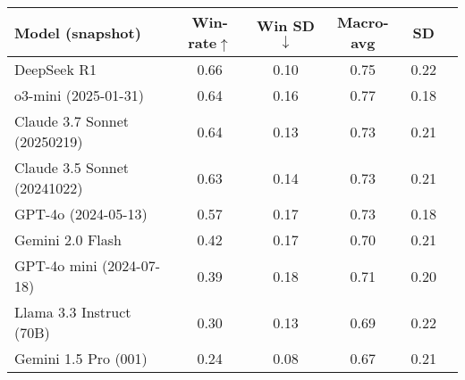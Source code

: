 \begin{tabular}{lccccc}
\toprule
Model (snapshot) & Win-rate$\uparrow$ & Win SD$\downarrow$ & Macro-avg & SD \\
\midrule
DeepSeek R1 & 0.66 & 0.10 & 0.75 & 0.22 \\
o3-mini (2025-01-31) & 0.64 & 0.16 & 0.77 & 0.18 \\
Claude 3.7 Sonnet (20250219) & 0.64 & 0.13 & 0.73 & 0.21 \\
Claude 3.5 Sonnet (20241022) & 0.63 & 0.14 & 0.73 & 0.21 \\
GPT-4o (2024-05-13) & 0.57 & 0.17 & 0.73 & 0.18 \\
Gemini 2.0 Flash & 0.42 & 0.17 & 0.70 & 0.21 \\
GPT-4o mini (2024-07-18) & 0.39 & 0.18 & 0.71 & 0.20 \\
Llama 3.3 Instruct (70B) & 0.30 & 0.13 & 0.69 & 0.22 \\
Gemini 1.5 Pro (001) & 0.24 & 0.08 & 0.67 & 0.21 \\
\bottomrule
\end{tabular}
